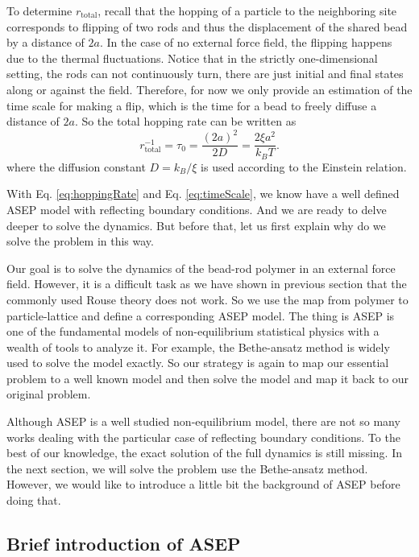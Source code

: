 To determine $r_{\text{total}}$, recall that the hopping of a particle to the neighboring site corresponds to flipping of two rods and thus the displacement of the shared bead by a distance of $2a$. In the case of no external force field, the flipping happens due to the thermal fluctuations. Notice that in the strictly one-dimensional setting, the rods can not continuously turn, there are just initial and final states along or against the field. Therefore, for now we only provide an estimation of the time scale for making a flip, which is the time for a bead to freely diffuse a distance of $2a$. So the total hopping rate can be written as
\begin{equation}
    \label{eq:timeScale}
    r_{\text{total}}^{-1} = \tau_0 = \frac{(2a)^2}{2D} = \frac{2\xi a^2}{k_{B}T}.
\end{equation}
where the diffusion constant $D = k_B/\xi$ is used according to the Einstein relation. 

With Eq. \eqref{eq:hoppingRate} and Eq. \eqref{eq:timeScale}, we know have a well defined ASEP model with reflecting boundary conditions. And we are ready to delve deeper to solve the dynamics. But before that, let us first explain  why do we solve the problem in this way. 

Our goal is to solve the dynamics of the bead-rod polymer in an external force field. However, it is a difficult task as we have shown in previous section that the commonly used Rouse theory does not work. So we use the map from polymer to particle-lattice and define a corresponding ASEP model. The thing is ASEP is one of the fundamental models of non-equilibrium statistical physics with a wealth of tools to analyze it. For example, the Bethe-ansatz method is widely used to solve the model exactly. So our strategy is again to map our essential problem to a well known model and then solve the model and map it back to our original problem. 

Although ASEP is a well studied non-equilibrium model, there are not so many works dealing with the particular case of reflecting boundary conditions. To the best of our knowledge, the exact solution of the full dynamics is still missing. In the next section, we will solve the problem use the Bethe-ansatz method. However, we would like to introduce a little bit the background of ASEP before doing that. 


\subsection{Brief introduction of ASEP}
\label{sub:brief_introduction_of_asep}

